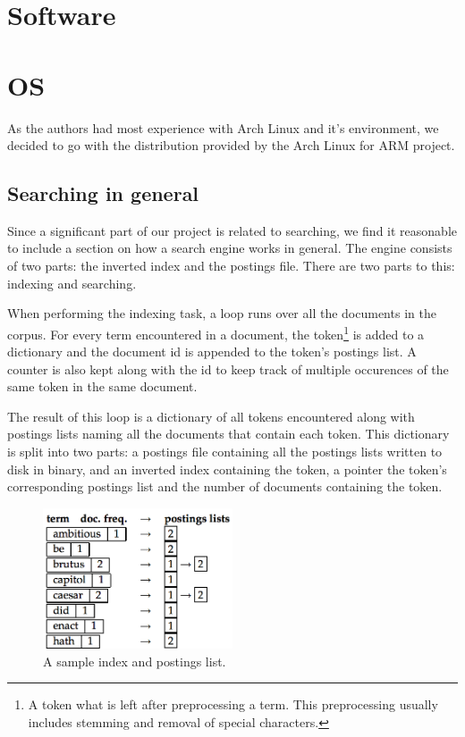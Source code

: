 \clearpage
\section{Software}
\section{OS}
As the authors had most experience with Arch Linux and it's environment, we decided to go with the distribution provided by the Arch Linux for ARM project.

\subsection{Searching in general}
Since a significant part of our project is related to searching, we find it reasonable to include a section on how a search engine works in general. The engine consists of two parts: the inverted index and the postings file. There are two parts to this: indexing and searching.

When performing the indexing task, a loop runs over all the documents in the corpus. For every term encountered in a document, the token\footnote{A token what is left after preprocessing a term. This preprocessing usually includes stemming and removal of special characters.} is added to a dictionary and the document id is appended to the token's postings list. A counter is also kept along with the id to keep track of multiple occurences of the same token in the same document.

The result of this loop is a dictionary of all tokens encountered along with postings lists naming all the documents that contain each token. This dictionary is split into two parts: a postings file containing all the  postings lists written to disk in binary, and an inverted index containing the token, a pointer the token's corresponding postings list and the number of documents containing the token.

\begin{figure}[h]
    \includegraphics[width=0.5\textwidth]{software/index_postings_lists}
    \caption{A sample index and postings list.}
    \label{fig:index_postings_lists_sw}
\end{figure}

